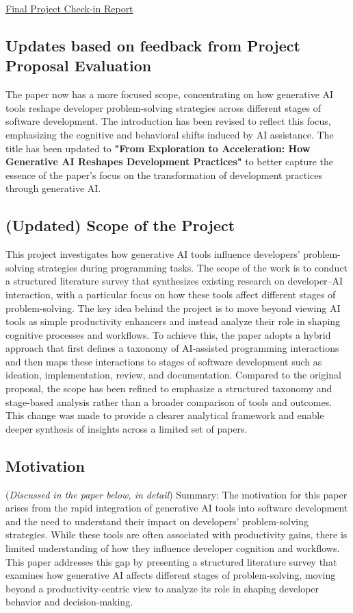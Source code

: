 \thispagestyle{empty}
\begin{center}
    {\Large \uline{Final Project Check-in Report}}
\end{center}

\subsection*{Updates based on feedback from Project Proposal Evaluation} The paper now has a more focused scope, concentrating on how generative AI tools reshape developer problem-solving strategies across different stages of software development. The introduction has been revised to reflect this focus, emphasizing the cognitive and behavioral shifts induced by AI assistance. The title has been updated to \textbf{"From Exploration to Acceleration: How Generative AI Reshapes Development Practices"} to better capture the essence of the paper's focus on the transformation of development practices through generative AI.

\subsection*{(Updated) Scope of the Project}
This project investigates how generative AI tools influence developers’ problem-solving strategies during programming tasks. The scope of the work is to conduct a structured literature survey that synthesizes existing research on developer–AI interaction, with a particular focus on how these tools affect different stages of problem-solving. The key idea behind the project is to move beyond viewing AI tools as simple productivity enhancers and instead analyze their role in shaping cognitive processes and workflows. To achieve this, the paper adopts a hybrid approach that first defines a taxonomy of AI-assisted programming interactions and then maps these interactions to stages of software development such as ideation, implementation, review, and documentation. Compared to the original proposal, the scope has been refined to emphasize a structured taxonomy and stage-based analysis rather than a broader comparison of tools and outcomes. This change was made to provide a clearer analytical framework and enable deeper synthesis of insights across a limited set of papers.

\subsection*{Motivation}
(\textit{Discussed in the paper below, in detail}) Summary: The motivation for this paper arises from the rapid integration of generative AI tools into software development and the need to understand their impact on developers’ problem-solving strategies. While these tools are often associated with productivity gains, there is limited understanding of how they influence developer cognition and workflows. This paper addresses this gap by presenting a structured literature survey that examines how generative AI affects different stages of problem-solving, moving beyond a productivity-centric view to analyze its role in shaping developer behavior and decision-making.

